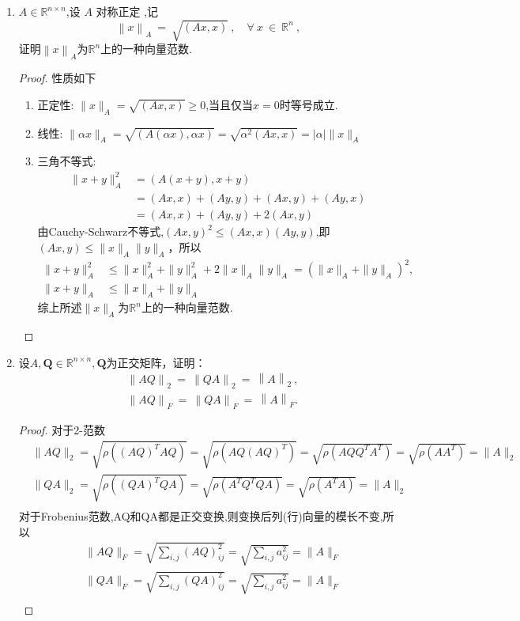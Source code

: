\documentclass[a4paper]{article}
\begin{document}
\begin{enumerate}
  \item $A\in \mathbb{R} ^{n\times n}$,设 $A$ 对称正定 ,记
  $$\left\|x\right\|_A\:=\:\sqrt{\left(Ax,x\right)}\:,\quad\forall\:x\:\in\:\mathbb{R}^n\:,$$
  证明$\left\|x\right\|_A$为$\mathbb{R}^n$上的一种向量范数.
  \begin{proof}
    性质如下
    \begin{enumerate}[label=（\roman*）]
      \item 正定性: $\|x\|_A=\sqrt{(Ax,x)}\ge0$,当且仅当$x=0$时等号成立.
      \item 线性: $\|\alpha x\|_A=\sqrt{(A(\alpha x),\alpha x)}=\sqrt{\alpha^2(Ax,x)}=|\alpha|\|x\|_A$
      \item 三角不等式: 
        \begin{align*}
          \|x+y\|_A^2&=(A(x+y),x+y)\\
          &=(Ax,x)+(Ay,y)+(Ax,y)+(Ay,x)\\
          &=(Ax,x)+(Ay,y)+2(Ax,y)
        \end{align*}
        由Cauchy-Schwarz不等式,$(Ax,y)^2\le (Ax,x)(Ay,y)$,即$(Ax,y)\le \|x\|_A\|y\|_A$，所以
        \begin{align*}
          \|x+y\|_A^2&\le \|x\|_A^2+\|y\|_A^2+2\|x\|_A\|y\|_A=(\|x\|_A+\|y\|_A)^2,\\
          \|x+y\|_A&\le \|x\|_A+\|y\|_A
        \end{align*}
        综上所述$\|x\|_A$为$\mathbb{R}^n$上的一种向量范数.
    \end{enumerate}
  \end{proof}
  
  \item 设$A,\boldsymbol{Q}\in\mathbb{R}^{n\times n},\boldsymbol{Q}$为正交矩阵，证明：
  $$\begin{aligned}&\left\|AQ\right\|_{2}\:=\:\left\|QA\right\|_{2}\:=\:\left\|A\right\|_{2}\:,\\&\left\|AQ\right\|_{F}\:=\:\left\|QA\right\|_{F}\:=\:\left\|A\right\|_{F}.\end{aligned}$$
  \begin{proof}
    对于2-范数
    \begin{align*}
      &\|AQ\|_2=\sqrt{\rho((AQ)^TAQ)}=\sqrt{\rho(AQ(AQ)^T)}=\sqrt{\rho(AQQ^TA^T)}=\sqrt{\rho(AA^T)}=\|A\|_2\\
      &\|QA\|_2=\sqrt{\rho((QA)^TQA)}=\sqrt{\rho(A^TQ^TQA)}=\sqrt{\rho(A^TA)}=\|A\|_2\\
    \end{align*}
    对于Frobenius范数,AQ和QA都是正交变换,则变换后列(行)向量的模长不变,所以
    \begin{align*}
      &\|AQ\|_F=\sqrt{\sum_{i,j}(AQ)_{ij}^2}=\sqrt{\sum_{i,j}a_{ij}^2}=\|A\|_F\\
      &\|QA\|_F=\sqrt{\sum_{i,j}(QA)_{ij}^2}=\sqrt{\sum_{i,j}a_{ij}^2}=\|A\|_F\\
    \end{align*}
  \end{proof}


\end{enumerate}
\end{document}

